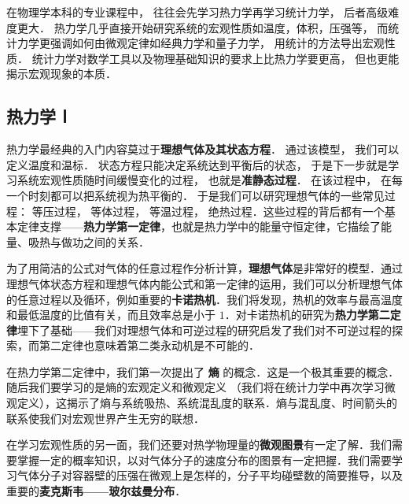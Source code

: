 
\begin{issues}
\issueDraft
\end{issues}

在物理学本科的专业课程中， 往往会先学习热力学再学习统计力学， 后者高级难度更大． 热力学几乎直接开始研究系统的宏观性质如温度，体积，压强等， 而统计力学更强调如何由微观定律如经典力学和量子力学， 用统计的方法导出宏观性质． 统计力学对数学工具以及物理基础知识的要求上比热力学要更高， 但也更能揭示宏观现象的本质．

\subsection{热力学 Ⅰ}
热力学最经典的入门内容莫过于\textbf{理想气体及其状态方程}． 通过该模型， 我们可以定义温度和温标． 状态方程只能决定系统达到平衡后的状态， 于是下一步就是学习系统宏观性质随时间缓慢变化的过程， 也就是\textbf{准静态过程}． 在该过程中， 在每一个时刻都可以把系统视为热平衡的． 于是我们可以研究理想气体的一些常见过程： 等压过程， 等体过程， 等温过程， 绝热过程．这些过程的背后都有一个基本定律支撑——\textbf{热力学第一定律}，也就是热力学中的能量守恒定律，它描绘了能量、吸热与做功之间的关系．

为了用简洁的公式对气体的任意过程作分析计算，\textbf{理想气体}是非常好的模型．通过理想气体状态方程和理想气体内能公式和第一定律的运用，我们可以分析理想气体的任意过程以及循环，例如重要的\textbf{卡诺热机}．我们将发现，热机的效率与最高温度和最低温度的比值有关，而且效率总是小于 $1$．对卡诺热机的研究为\textbf{热力学第二定律}埋下了基础——我们对理想气体和可逆过程的研究启发了我们对不可逆过程的探索，而第二定律也意味着第二类永动机是不可能的．

在热力学第二定律中，我们第一次提出了 \textbf{熵} 的概念．这是一个极其重要的概念．随后我们要学习的是熵的宏观定义和微观定义 （我们将在统计力学中再次学习微观定义），这揭示了熵与系统吸热、系统混乱度的联系．熵与混乱度、时间箭头的联系使我们对宏观世界产生无穷的联想．

在学习宏观性质的另一面，我们还要对热学物理量的\textbf{微观图景}有一定了解．我们需要掌握一定的概率知识，以对气体分子的速度分布的图景有一定把握．我们需要学习气体分子对容器壁的压强在微观上是怎样的，分子平均碰壁数的简要推导，以及重要的\textbf{麦克斯韦——玻尔兹曼分布}．

